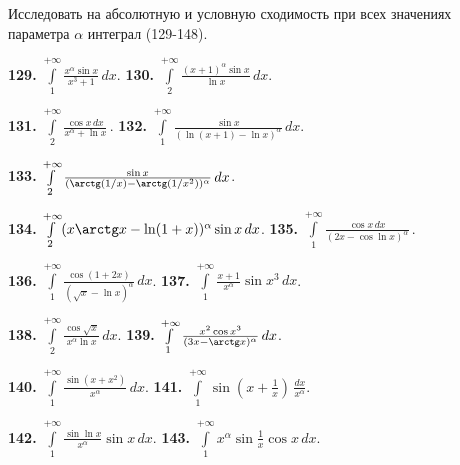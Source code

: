 \documentclass[11pt, a4paper]{article}
\begin{document}
	\begin{spacing}{0.5}
		 Исследовать на абсолютную и условную сходимость при всех значениях  параметра $\alpha$ интеграл (129-148).
	\end{spacing}
	
	\vspace{0.8cm}
	\textbf{129.}
	$\int\limits_1^{+\infty} \frac{x^\alpha\sin x}{x^3 + 1} \, dx$. \hspace{0.1cm}
	\textbf{130.}
	$\int\limits_2^{+\infty} \frac{(x + 1)^\alpha\sin x}{\ln x} \, dx$. \hspace{0.1cm}
	
	\textbf{131.}
	$\int\limits_2^{+\infty} \frac{\cos x \, dx}{x^\alpha + \ln x} \,$. \hspace{0.1cm}
	\textbf{132.}
	$\int\limits_1^{+\infty} \frac{\sin x}{(\ln(x + 1) - \ln x)^\alpha} \, dx$. \hspace{0.1cm}
	
	\textbf{133.}
	$\int\limits_2^{+\infty} \frac{\sin x}{(\arctg(1/x) - \arctg(1/x^2))^\alpha} \, dx$. \hspace{0.1cm}
	
	\textbf{134.}
	$\int\limits_2^{+\infty} (x\arctg x - \ln(1 + x))^\alpha\sin x \, dx$. \hspace{0.1cm}
	\textbf{135.}
	$\int\limits_1^{+\infty} \frac{\cos x \, dx}{(2x-\cos\ln x)^\alpha} \,$. \hspace{0.1cm}
	
	\textbf{136.}
	$\int\limits_1^{+\infty} \frac{\cos(1 + 2x)}{(\sqrt{x} - \ln x)^\alpha} \, dx$. \hspace{0.1cm}
	\textbf{137.}
	$\int\limits_1^{+\infty} \frac{x + 1}{x^\alpha}\sin x^3 \, dx$. \hspace{0.1cm}
	
	\textbf{138.}
	$\int\limits_2^{+\infty} \frac{\cos\sqrt{x}}{x^\alpha\ln x} \, dx$. \hspace{0.1cm}
	\textbf{139.}
	$\int\limits_1^{+\infty} \frac{x^2\cos x^3}{(3x - \arctg x)^\alpha} \, dx$. \hspace{0.1cm}
	
	\textbf{140.}
	$\int\limits_1^{+\infty} \frac{\sin(x + x^2)}{x^\alpha} \, dx$. \hspace{0.1cm}
	\textbf{141.}
	$\int\limits_1^{+\infty} \sin(x + \frac{1}{x}) \, \frac{dx}{x^\alpha}$. \hspace{0.1cm}
	
	\textbf{142.}
	$\int\limits_1^{+\infty} \frac{\sin\ln x}{x^\alpha}\sin x \, dx$. \hspace{0.1cm}
	\textbf{143.}
	$\int\limits_1^{+\infty} x^\alpha\sin\frac{1}{x}\cos x \, dx$. \hspace{0.1cm}
	
\end{document}
